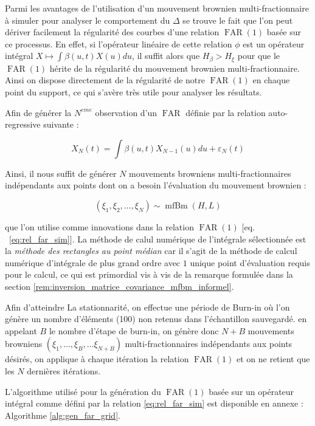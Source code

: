 
Parmi les avantages de l'utilisation d'un mouvement brownien multi-fractionnaire à simuler pour analyser le comportement du $\Delta$ se trouve le fait que l'on peut dériver facilement la régularité des courbes d'une relation $\operatorname{FAR}(1)$ basée sur ce processus. En effet, si l'opérateur linéaire de cette relation $\phi$ est un opérateur intégral $X \mapsto \int \beta(u,t) X(u)du$, il suffit alors que $H_\beta > H_\xi$ pour que le $\operatorname{FAR}(1)$ hérite de la régularité du mouvement brownien multi-fractionnaire. Ainsi on dispose directement de la régularité de notre $\operatorname{FAR}(1)$ en chaque point du support, ce qui s'avère très utile pour analyser les résultats.

Afin de générer la $N^{eme}$ observation d'un $\operatorname{FAR}$ définie par la relation auto-regressive suivante :

\begin{equation}
	X_N(t) = \int \beta(u,t)X_{N-1}(u)du + \varepsilon_N(t) \label{eq:rel_far_sim}
\end{equation}

Ainsi, il nous suffit de générer $N$ mouvements browniens multi-fractionnaires indépendants aux points dont on a besoin l'évaluation du mouvement brownien :

\begin{equation*}
	(\xi_1 , \xi_2, \dots , \xi_N ) \sim \operatorname{mfBm}(H, L)
\end{equation*}



\noindent que l'on utilise comme innovations dans la relation $\operatorname{FAR}(1)$ $\bigl[$eq. ~\ref{eq:rel_far_sim}$\bigr]$. La méthode de calul numérique de l'intégrale sélectionnée est la \emph{méthode des rectangles au point médian} car il s'agit de la méthode de calcul numérique d'intégrale de plus grand ordre avec $1$ unique point d'évaluation requis pour le calcul, ce qui est primordial vis à vis de la remarque formulée dans la section \ref{rem:inversion_matrice_covariance_mfbm_informel}.

\bigskip

Afin d'atteindre La stationnarité, on effectue une période de \og Burn-in \fg où l'on génère un nombre d'éléments (100) non retenus dans l'échantillon sauvegardé. en appelant $B$ le nombre d'étape de burn-in, on génère donc $N+B$ mouvements browniens $(\xi_1 , \dots ,\xi_B, \dots \xi_{N+B} )$ multi-fractionnaires indépendants aux points désirés, on applique à chaque itération la relation $\operatorname{FAR}(1)$ et on ne retient que les $N$ dernières itérations.

\bigskip

\noindent L'algorithme utilisé pour la génération du $\operatorname{FAR}(1)$ basée sur un opérateur intégral comme défini par la relation \ref{eq:rel_far_sim} est disponible en annexe : Algorithme \ref{alg:gen_far_grid}.
